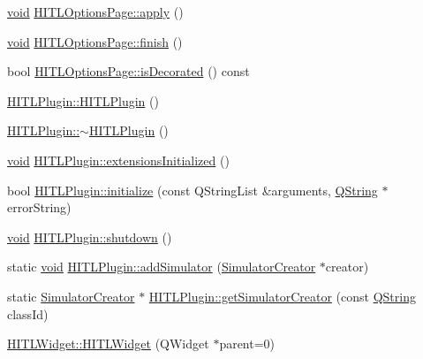\begin{DoxyCompactItemize}
\item 
\hyperlink{group___u_a_v_objects_plugin_ga444cf2ff3f0ecbe028adce838d373f5c}{void} \hyperlink{group___h_i_t_l_plugin_ga6554b77636be9ff76148c91411929d4a}{\-H\-I\-T\-L\-Options\-Page\-::apply} ()
\item 
\hyperlink{group___u_a_v_objects_plugin_ga444cf2ff3f0ecbe028adce838d373f5c}{void} \hyperlink{group___h_i_t_l_plugin_ga2a1b2e14f1c4d4cd1c5f63c1c906f06d}{\-H\-I\-T\-L\-Options\-Page\-::finish} ()
\item 
bool \hyperlink{group___h_i_t_l_plugin_ga0f6209b81c7a24419e848b6740d72f24}{\-H\-I\-T\-L\-Options\-Page\-::is\-Decorated} () const 
\item 
\hyperlink{group___h_i_t_l_plugin_ga0f1bfd313d4d0d404f51e34d8dbaacc5}{\-H\-I\-T\-L\-Plugin\-::\-H\-I\-T\-L\-Plugin} ()
\item 
\hyperlink{group___h_i_t_l_plugin_ga371454242ad0b7e52024243ec91c7d13}{\-H\-I\-T\-L\-Plugin\-::$\sim$\-H\-I\-T\-L\-Plugin} ()
\item 
\hyperlink{group___u_a_v_objects_plugin_ga444cf2ff3f0ecbe028adce838d373f5c}{void} \hyperlink{group___h_i_t_l_plugin_ga30d63de205d36f5e637e17ae3efb35cd}{\-H\-I\-T\-L\-Plugin\-::extensions\-Initialized} ()
\item 
bool \hyperlink{group___h_i_t_l_plugin_ga113a69fc6f312ce4658d3c6266e3545f}{\-H\-I\-T\-L\-Plugin\-::initialize} (const \-Q\-String\-List \&arguments, \hyperlink{group___u_a_v_objects_plugin_gab9d252f49c333c94a72f97ce3105a32d}{\-Q\-String} $\ast$error\-String)
\item 
\hyperlink{group___u_a_v_objects_plugin_ga444cf2ff3f0ecbe028adce838d373f5c}{void} \hyperlink{group___h_i_t_l_plugin_gadc35670ca57c30770f97bf6e95e9297b}{\-H\-I\-T\-L\-Plugin\-::shutdown} ()
\item 
static \hyperlink{group___u_a_v_objects_plugin_ga444cf2ff3f0ecbe028adce838d373f5c}{void} \hyperlink{group___h_i_t_l_plugin_ga54ec8bdd017e6c77dc8f88009474d78e}{\-H\-I\-T\-L\-Plugin\-::add\-Simulator} (\hyperlink{class_simulator_creator}{\-Simulator\-Creator} $\ast$creator)
\item 
static \hyperlink{class_simulator_creator}{\-Simulator\-Creator} $\ast$ \hyperlink{group___h_i_t_l_plugin_gad74c7b21a8be7419684135b3f0498b01}{\-H\-I\-T\-L\-Plugin\-::get\-Simulator\-Creator} (const \hyperlink{group___u_a_v_objects_plugin_gab9d252f49c333c94a72f97ce3105a32d}{\-Q\-String} class\-Id)
\item 
\hyperlink{group___h_i_t_l_plugin_ga87da797826b0d587d7ed590e61741ca6}{\-H\-I\-T\-L\-Widget\-::\-H\-I\-T\-L\-Widget} (\-Q\-Widget $\ast$parent=0)

\end{DoxyCompactItemize}
